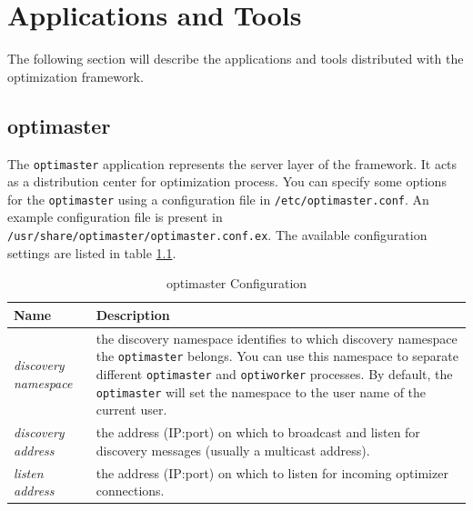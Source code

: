 \documentclass{report}
\begin{document}
\chapter{Applications and Tools}
The following section will describe the applications and tools distributed with
the optimization framework.

\section{optimaster}\label{app:optimaster}
The \verb!optimaster! application represents the server layer of the framework. It
acts as a distribution center for optimization process. You can specify some
options for the \verb!optimaster! using a configuration file in \verb!/etc/optimaster.conf!.
An example configuration file is present in
\verb!/usr/share/optimaster/optimaster.conf.ex!. The available configuration
settings are listed in table \ref{tab:optimaster_configuration}.

\begin{table}[h!tb]\caption{optimaster Configuration}\label{tab:optimaster_configuration}\vspace{0.1in}
	\centering

	\begin{tabular}{p{4cm} p{10cm}}
		\toprule
		\textbf{Name} & \textbf{Description} \\
		\midrule
		\textit{discovery namespace} & the discovery namespace identifies
		                               to which discovery namespace the
		                               \verb!optimaster! belongs. You can use this
		                               namespace to separate different
		                               \verb!optimaster! and \verb!optiworker! processes.
		                               By default, the \verb!optimaster! will set
		                               the namespace to the user name of the
		                               current user. \\
		\textit{discovery address} & the address (IP:port) on which to
		                             broadcast and listen for discovery
		                             messages (usually a multicast address). \\
		\textit{listen address} & the address (IP:port) on which to
		                          listen for incoming optimizer connections. \\
		\bottomrule
	\end{tabular}
\end{table}
\end{document}

